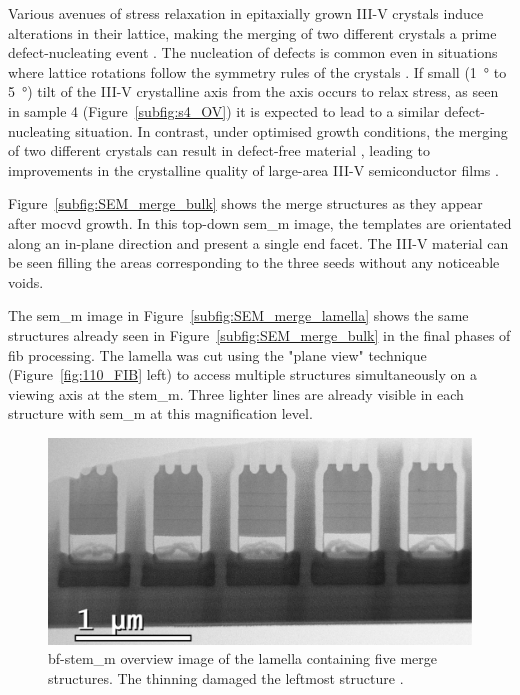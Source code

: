 Various avenues of stress relaxation in epitaxially grown III-V crystals induce alterations in their lattice, making the merging of two different crystals a prime defect-nucleating event \cite{Jacobsson2015}. The nucleation of defects is common even in situations where lattice rotations follow the symmetry rules of the crystals \cite{Rossi2023}. If small (\qty{1}{\degree} to \qty{5}{\degree}) tilt of the III-V crystalline axis from the  axis occurs to relax stress, as seen in sample 4 (Figure~\ref{subfig:s4_OV}) it is expected to lead to a similar defect-nucleating situation. In contrast, under optimised growth conditions, the merging of two different crystals can result in defect-free material \cite{Imanishi2012}, leading to improvements in the crystalline quality of large-area III-V semiconductor films \cite{Imade2014}.

Figure~\ref{subfig:SEM_merge_bulk} shows the merge structures as they appear after \acs{mocvd} growth. In this top-down \acs{sem_m} image, the templates are orientated along an in-plane  direction and present a single  end facet. The III-V material can be seen filling the areas corresponding to the three seeds without any noticeable voids. 

The \acs{sem_m} image in Figure~\ref{subfig:SEM_merge_lamella} shows the same structures already seen in Figure~\ref{subfig:SEM_merge_bulk} in the final phases of \acs{fib} processing. The lamella was cut using the "plane view" technique (Figure~\ref{fig:110_FIB} left) to access multiple structures simultaneously on a  viewing axis at the \acs{stem_m}. Three lighter lines are already visible in each structure with \acs{sem_m} at this magnification level.

\begin{figure}
    \centering
    \includegraphics[width=\textwidth]{4_Properties/Fig/merge_OV.pdf}
    \caption{\acs{bf}-\acs{stem_m} overview image of the lamella containing five merge structures. The thinning damaged the leftmost structure \cite{Brugnolotto2023_2}.}
    \label{fig:merge_ov}
\end{figure}

